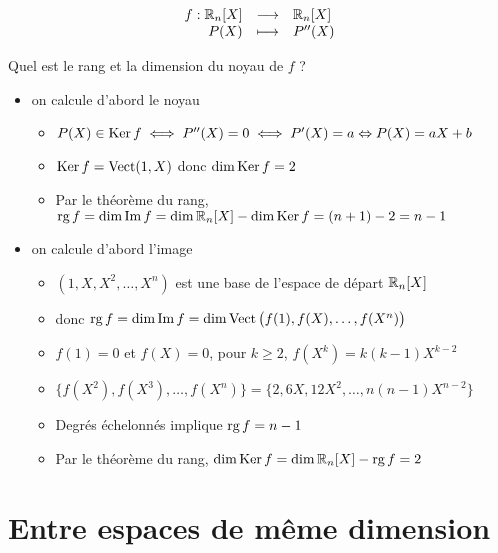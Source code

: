 \begin{frame}
\begin{exemple}
$$\begin{array}{rcl}
f : \mathbb{R}_n[X] &\longrightarrow&  \mathbb{R}_n[X] \\
        P(X) &\longmapsto& P''(X) 
  \end{array}$$
  
\pause

Quel est le rang et la dimension du noyau de $f$ ?

\pause
\begin{itemize}
  \item {} on calcule d'abord le noyau
  \pause
  \begin{itemize}
    \item $P(X) \in \mathop{\text{Ker}}\nolimits f  \iff P''(X) = 0 \iff P'(X)=a \Leftrightarrow P(X) = aX+b$
    \pause
    \item $\mathop{\text{Ker}}\nolimits f = \mathop{\text{Vect}}\nolimits(1,X)$ donc $\dim \mathop{\text{Ker}}\nolimits f = 2$
    \pause
    \item Par le théorème du rang, $\mathop{\text{rg}}\nolimits f = \dim \mathop{\text{Im}}\nolimits f = \dim \mathbb{R}_n[X] - \dim \mathop{\text{Ker}}\nolimits f = (n+1) - 2 = n-1$
  \end{itemize}
  
  \pause
  \item {} on calcule d'abord l'image
  \begin{itemize}
  \pause
    \item $(1,X,X^2,\ldots,X^n)$ est une base de l'espace de départ $\mathbb{R}_n[X]$
    \pause
    \item donc $\mathop{\text{rg}}\nolimits f = \dim \mathop{\text{Im}}\nolimits f = \dim \mathop{\text{Vect}}\nolimits \big(f(1), f(X), \ldots, f(X^n) \big)$
    \pause
    \item $f(1)=0$ et $f(X)=0$\pause, pour $k \ge 2$, $f(X^k) = k(k-1)X^{k-2}$
    \pause
    \item $\big\{f(X^2), f(X^3), \ldots, f(X^n) \big\} 
    = \big\{2, 6X, 12X^2, \ldots, n(n-1)X^{n-2}\big\}$
    \pause
    \item Degrés échelonnés implique $\mathop{\text{rg}}\nolimits f = n-1$
    \pause
    \item Par le théorème du rang, $\dim \mathop{\text{Ker}}\nolimits f = \dim \mathbb{R}_n[X] - \mathop{\text{rg}}\nolimits f = 2$
  \end{itemize}
\end{itemize}
\end{exemple}
\end{frame}

\section{Entre espaces de même dimension}

